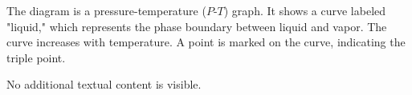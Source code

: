The diagram is a pressure-temperature (\(P\)-\(T\)) graph. It shows a curve labeled "liquid," which represents the phase boundary between liquid and vapor. The curve increases with temperature. A point is marked on the curve, indicating the triple point.  

No additional textual content is visible.
